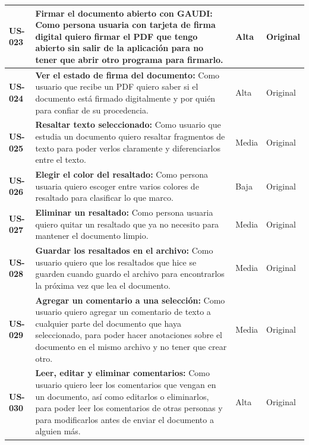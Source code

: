 \begin{longtable}{|l||p{7cm}|l|l|}

\textbf{US-023} & 
\textbf{Firmar el documento abierto con GAUDI:} Como persona usuaria con tarjeta de firma digital quiero firmar el PDF que tengo abierto sin salir de la aplicación para no tener que abrir otro programa para firmarlo. & Alta & Original\\
\hline

\textbf{US-024} & 
\textbf{Ver el estado de firma del documento:} Como usuario que recibe un PDF
quiero saber si el documento está firmado digitalmente y por quién
para confiar de su procedencia. & Alta & Original\\
\hline

\textbf{US-025} & 
\textbf{Resaltar texto seleccionado:} Como usuario que estudia un documento quiero resaltar fragmentos de texto para poder verlos claramente y diferenciarlos entre el texto. & Media & Original\\
\hline

\textbf{US-026} & 
\textbf{Elegir el color del resaltado:} Como persona usuaria quiero escoger entre varios colores de resaltado para clasificar lo que marco. & Baja & Original\\
\hline

\textbf{US-027} & 
\textbf{Eliminar un resaltado:} Como persona usuaria quiero quitar un resaltado que ya no necesito para mantener el documento limpio. & Media & Original\\
\hline

\textbf{US-028} & 
\textbf{Guardar los resaltados en el archivo:} Como usuario quiero que los resaltados que hice se guarden cuando guardo el archivo para encontrarlos la próxima vez que lea el documento. & Media & Original\\
\hline

\textbf{US-029} & 
\textbf{Agregar un comentario a una selección:} Como usuario quiero agregar un comentario de texto a cualquier parte del documento que haya seleccionado, para poder hacer anotaciones sobre el documento en el mismo archivo y no tener que crear otro. & Media & Original\\
\hline

\textbf{US-030} & 
\textbf{Leer, editar y eliminar comentarios:} Como usuario quiero leer los comentarios que vengan en un documento, así como editarlos o eliminarlos, para poder leer los comentarios de otras personas y para modificarlos antes de enviar el documento a alguien más. & Alta & Original\\
\hline


\end{longtable}
